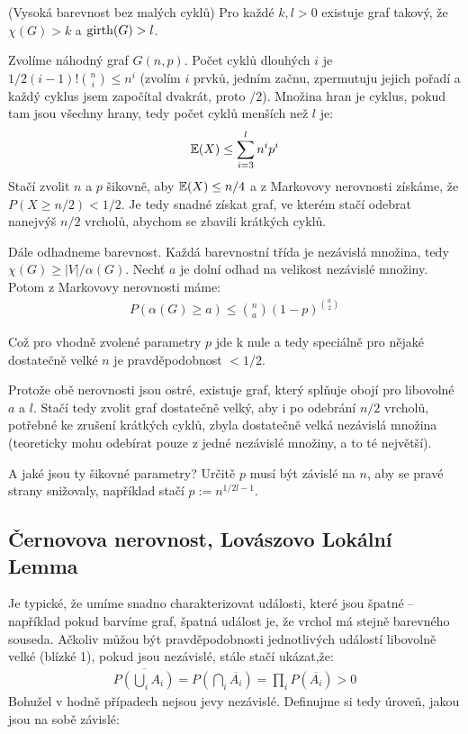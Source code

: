 \vt (Vysoká barevnost bez malých cyklů) Pro každé $k,l > 0$ existuje graf
takový, že $\chi(G) > k$ a $\operatorname{girth}(G) > l$.

\dk Zvolíme náhodný graf $G(n,p)$. Počet cyklů dlouhých $i$ je
$1/2(i-1)!\binom{n}{i}\leq n^i$ (zvolím $i$ prvků, jedním začnu, zpermutuju
jejich pořadí a každý cyklus jsem započítal dvakrát, proto $/2$). Množina hran
je cyklus, pokud tam jsou všechny hrany, tedy počet cyklů menších než $l$ je:
\begin{align}
	\mathbb{E}(X) \leq \sum_{i=3}^l n^ip^i
\end{align}
Stačí zvolit $n$ a $p$ šikovně, aby $\mathbb{E}(X) \leq n/4$ a z Markovovy nerovnosti
získáme, že $P(X \geq n/2) < 1/2$. Je tedy snadné získat graf, ve kterém stačí
odebrat nanejvýš $n/2$ vrcholů, abychom se zbavili krátkých cyklů.

Dále odhadneme barevnost. Každá barevnostní třída je nezávislá množina, tedy
$\chi(G) \geq |V| / \alpha(G)$. Nechť $a$ je dolní odhad na velikost nezávislé
množiny. Potom z Markovovy nerovnosti máme:
\begin{align}
	P(\alpha(G) \geq a) \leq \binom{n}{a}(1-p)^{\binom{a}{2}}
\end{align}

Což pro vhodně zvolené parametry $p$ jde k nule a tedy speciálně pro nějaké
dostatečně velké $n$ je pravděpodobnost $< 1/2$.

Protože obě nerovnosti jsou ostré, existuje graf, který splňuje obojí pro
libovolné $a$ a $l$. Stačí tedy zvolit graf dostatečně velký, aby i po odebrání
$n/2$ vrcholů, potřebné ke zrušení krátkých cyklů, zbyla dostatečně velká
nezávislá množina (teoreticky mohu odebírat pouze z jedné nezávislé množiny, a
to té největší).

A jaké jsou ty šikovné parametry? Určitě $p$ musí být závislé na $n$, aby se
pravé strany snižovaly, například stačí $p := n^{1/2l -1}$.

\subsection{Černovova nerovnost, Lovászovo Lokální Lemma}

Je typické, že umíme snadno charakterizovat události, které jsou špatné --
například pokud barvíme graf, špatná událost je, že vrchol má stejně barevného
souseda. Ačkoliv můžou být pravděpodobnosti jednotlivých událostí libovolně
velké (blízké 1), pokud jsou nezávislé, stále stačí ukázat,že:
\begin{align}
	\overline{P\left(\bigcup_i A_i\right)} = P\left(\bigcap_i
	\overline{A_i}\right) = \prod_i P(\overline{A_i})> 0
\end{align}
Bohužel v hodně případech nejsou jevy nezávislé. Definujme si tedy úroveň, jakou
jsou na sobě závislé:


